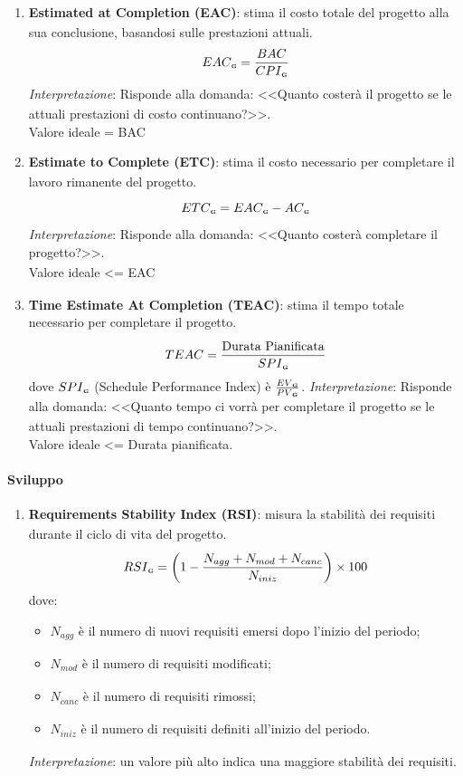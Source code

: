 \documentclass[a4paper,11pt]{article}
\newcommand{\G}{\textsubscript{\scalebox{0.6}{\textbf{G}}}}
\begin{document}
{\begin{enumerate}[label=\textbf{MPC0\arabic*}, leftmargin=4.5em, series=metriche_processo]
        \item \textbf{Estimated at Completion (EAC\G{})}: stima il costo totale del progetto\G{} alla sua conclusione, basandosi sulle prestazioni attuali.
        \[ EAC\G{} = \frac{BAC}{CPI\G{}} \]
        \textit{Interpretazione}: Risponde alla domanda: <<Quanto costerà il progetto\G{} se le attuali prestazioni di costo continuano?>>.\\Valore ideale = BAC
        
        \item \textbf{Estimate to Complete (ETC)\G{}}: stima il costo necessario per completare il lavoro rimanente del progetto\G{}.
        \[ ETC\G{} = EAC\G{} - AC\G{} \]
        \textit{Interpretazione}: Risponde alla domanda: <<Quanto costerà completare il progetto\G{}?>>.\\Valore ideale <= EAC\G{}
        
        \item \textbf{Time Estimate At Completion (TEAC)}: stima il tempo totale necessario per completare il progetto\G{}.
        \[ TEAC = \frac{\text{Durata Pianificata}}{SPI\G{}} \]
        dove $SPI\G{}$ (Schedule Performance Index\G{}) è $\frac{EV\G{}}{PV\G{}}$.
        \textit{Interpretazione}: Risponde alla domanda: <<Quanto tempo ci vorrà per completare il progetto\G{} se le attuali prestazioni di tempo continuano?>>.\\Valore ideale <= Durata pianificata.

    \end{enumerate}
}
\paragraph{Sviluppo}{
    \begin{enumerate}[label=\textbf{MPC0\arabic*}, leftmargin=4.5em, resume=metriche_processo]
    \item \textbf{Requirements Stability Index (RSI)\G{}}: misura la stabilità dei requisiti\G{} durante il ciclo di vita del progetto\G{}.
    \[
    RSI\G{} = \left( 1 - \frac{N_{agg} + N_{mod} + N_{canc}}{N_{iniz}} \right) \times 100
    \]
    dove:
    \begin{itemize}
        \item $N_{agg}$ è il numero di nuovi requisiti\G{} emersi dopo l'inizio del periodo;
        \item $N_{mod}$ è il numero di requisiti\G{} modificati;
        \item $N_{canc}$ è il numero di requisiti\G{} rimossi;
        \item $N_{iniz}$ è il numero di requisiti\G{} definiti all'inizio del periodo.
    \end{itemize}
    \textit{Interpretazione}: un valore più alto indica una maggiore stabilità dei requisiti\G{}.
\end{enumerate}

}
\end{document}
